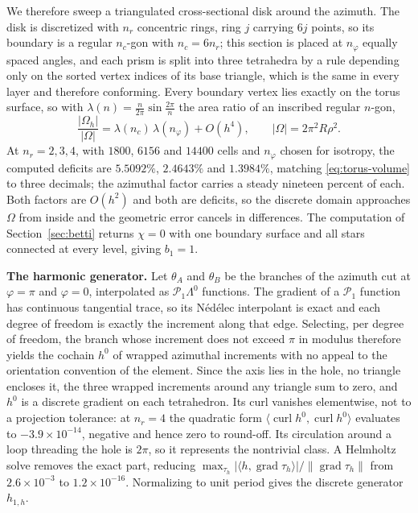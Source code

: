 \documentclass{article}
\DeclareMathOperator{\grad}{grad}
\DeclareMathOperator{\curl}{curl}
\newcommand{\ip}[2]{\langle #1,#2\rangle}
\newcommand{\norm}[1]{\lVert #1\rVert}
\begin{document}
We therefore sweep a triangulated cross-sectional disk around the azimuth.
The disk is discretized with $n_{r}$ concentric rings, ring $j$ carrying $6j$
points, so its boundary is a regular $n_{c}$-gon with $n_{c}=6n_{r}$; this
section is placed at $n_{\varphi}$ equally spaced angles, and each prism is
split into three tetrahedra by a rule depending only on the sorted vertex
indices of its base triangle, which is the same in every layer and therefore
conforming. Every boundary vertex lies exactly on the torus surface, so with
$\lambda(n)=\frac{n}{2\pi}\sin\frac{2\pi}{n}$ the area ratio of an inscribed
regular $n$-gon,
\begin{equation}\label{eq:torus-volume}
  \frac{|\Omega_{h}|}{|\Omega|}
  =\lambda(n_{c})\,\lambda(n_{\varphi})+O(h^{4}),
  \qquad |\Omega|=2\pi^{2}R\rho^{2}.
\end{equation}
At $n_{r}=2,3,4$, with $1800$, $6156$ and $14400$ cells and $n_{\varphi}$
chosen for isotropy, the computed deficits are $5.5092\%$, $2.4643\%$ and
$1.3984\%$, matching \eqref{eq:torus-volume} to three decimals; the azimuthal
factor carries a steady nineteen percent of each. Both factors are $O(h^{2})$
and both are deficits, so the discrete domain approaches $\Omega$ from inside
and the geometric error cancels in differences. The computation of
Section~\ref{sec:betti} returns $\chi=0$ with one boundary surface and all
stars connected at every level, giving $b_{1}=1$.

\medskip
\noindent\textbf{The harmonic generator.}
Let $\theta_{A}$ and $\theta_{B}$ be the branches of the azimuth cut at
$\varphi=\pi$ and $\varphi=0$, interpolated as $\mathcal{P}_{1}\Lambda^{0}$
functions. The gradient of a $\mathcal{P}_{1}$ function has continuous
tangential trace, so its N\'ed\'elec interpolant is exact and each degree of
freedom is exactly the increment along that edge. Selecting, per degree of
freedom, the branch whose increment does not exceed $\pi$ in modulus therefore
yields the cochain $h^{0}$ of wrapped azimuthal increments with no appeal to
the orientation convention of the element. Since the axis lies in the hole, no
triangle encloses it, the three wrapped increments around any triangle sum to
zero, and $h^{0}$ is a discrete gradient on each tetrahedron. Its curl
vanishes elementwise, not to a projection tolerance: at $n_{r}=4$ the
quadratic form $\ip{\curl h^{0}}{\curl h^{0}}$ evaluates to
$-3.9\times10^{-14}$, negative and hence zero to round-off. Its circulation
around a loop threading the hole is $2\pi$, so it represents the nontrivial
class. A Helmholtz solve removes the exact part, reducing
$\max_{\tau_{h}}|\ip{h}{\grad\tau_{h}}|/\norm{\grad\tau_{h}}$ from
$2.6\times10^{-3}$ to $1.2\times10^{-16}$. Normalizing to unit period gives
the discrete generator $h_{1,h}$.
\end{document}
